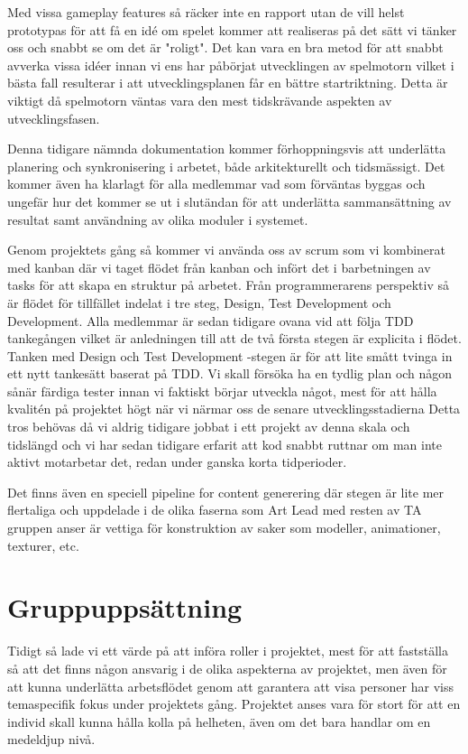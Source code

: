 \documentclass[a4paper]{report}
\begin{document}
Med vissa gameplay features så räcker inte en rapport utan de vill helst
prototypas för att få en idé om spelet kommer att realiseras på det sätt vi
tänker oss och snabbt se om det är "roligt". Det kan vara en bra metod för att
snabbt avverka vissa idéer innan vi ens har påbörjat utvecklingen av spelmotorn
vilket i bästa fall resulterar i att utvecklingsplanen får en bättre
startriktning. Detta är viktigt då spelmotorn väntas vara den mest tidskrävande
aspekten av utvecklingsfasen.

Denna tidigare nämnda dokumentation kommer förhoppningsvis att underlätta
planering och synkronisering i arbetet, både arkitekturellt och tidsmässigt.
Det kommer även ha klarlagt för alla medlemmar vad som förväntas byggas och
ungefär hur det kommer se ut i slutändan för att underlätta sammansättning av
resultat samt användning av olika moduler i systemet.

Genom projektets gång så kommer vi använda oss av scrum som vi kombinerat med
kanban där vi taget flödet från kanban och infört det i barbetningen av tasks
för att skapa en struktur på arbetet. Från programmerarens perspektiv så är
flödet för tillfället indelat i tre steg, Design, Test Development och
Development.  Alla medlemmar är sedan tidigare ovana vid att följa TDD
tankegången vilket är anledningen till att de två första stegen är explicita i
flödet. Tanken med Design och Test Development -stegen är för att lite smått
tvinga in ett nytt tankesätt baserat på TDD. Vi skall försöka ha en tydlig plan
och någon sånär färdiga tester innan vi faktiskt börjar utveckla något, mest
för att hålla kvalitén på projektet högt när vi närmar oss de senare
utvecklingsstadierna Detta tros behövas då vi aldrig tidigare jobbat i ett
projekt av denna skala och tidslängd och vi har sedan tidigare erfarit att kod
snabbt ruttnar om man inte aktivt motarbetar det, redan under ganska korta
tidperioder.

Det finns även en speciell pipeline for content generering där stegen är lite
mer flertaliga och uppdelade i de olika faserna som Art Lead med resten av TA
gruppen anser är vettiga för konstruktion av saker som modeller, animationer,
texturer, etc.

\section*{Gruppuppsättning}

Tidigt så lade vi ett värde på att införa roller i projektet, mest för att
fastställa så att det finns någon ansvarig i de olika aspekterna av projektet, men
även för att kunna underlätta arbetsflödet genom att garantera att visa
personer har viss temaspecifik fokus under projektets gång. Projektet
anses vara för stort för att en individ skall kunna hålla kolla på helheten,
även om det bara handlar om en medeldjup nivå.
\end{document}

